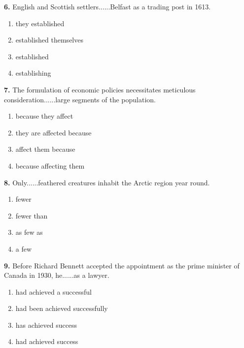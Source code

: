 \documentclass[12pt]{article}
\begin{document}
\par
\vspace{0.25\baselineskip}
\noindent\textbf{6.} English and Scottish settlers......Belfast as a trading post in 1613.
\begin{enumerate}[label=(\Alph*),leftmargin=*,itemsep=0.2em]
\item they established
\item established themselves
\item established
\item establishing
\end{enumerate}
\par
\vspace{0.25\baselineskip}
\noindent\textbf{7.} The formulation of economic policies necessitates meticulous consideration......large segments of the population.
\begin{enumerate}[label=(\Alph*),leftmargin=*,itemsep=0.2em]
\item because they affect
\item they are affected because
\item affect them because
\item because affecting them
\end{enumerate}
\par
\vspace{0.25\baselineskip}
\noindent\textbf{8.} Only......feathered creatures inhabit the Arctic region year round.
\begin{enumerate}[label=(\Alph*),leftmargin=*,itemsep=0.2em]
\item fewer
\item fewer than
\item as few as
\item a few
\end{enumerate}
\par
\vspace{0.25\baselineskip}
\noindent\textbf{9.} Before Richard Bennett accepted the appointment as the prime minister of Canada in 1930, he......as a lawyer.
\begin{enumerate}[label=(\Alph*),leftmargin=*,itemsep=0.2em]
\item had achieved a successful
\item had been achieved successfully
\item has achieved success
\item had achieved success
\end{enumerate}
\par
\vspace{0.25\baselineskip}
\end{document}
